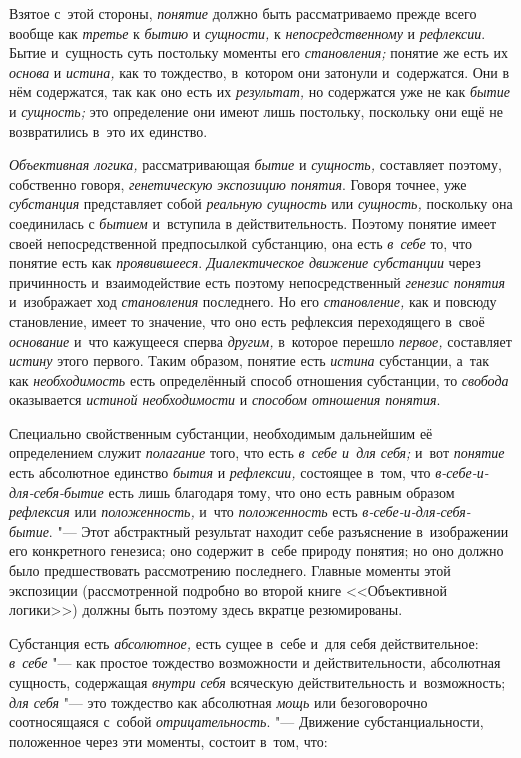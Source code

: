 Взятое с~этой стороны, {\em понятие} должно быть рассматриваемо прежде всего
вообще как {\em третье} к {\em бытию} и {\em сущности,} к
{\em непосредственному} и {\em рефлексии}. Бытие и~сущность суть постольку
моменты его {\em становления;} понятие же есть их {\em основа} и
{\em истина,} как то тождество, в~котором они затонули и~содержатся. Они в
нём содержатся, так как оно есть их {\em результат,} но содержатся уже не
как {\em бытие} и {\em сущность;} это определение они имеют лишь постольку,
поскольку они ещё не возвратились в~это их единство.

{\em Объективная логика,} рассматривающая {\em бытие} и {\em сущность,}
составляет поэтому, собственно говоря, {\em генетическую экспозицию понятия}.
Говоря точнее, уже {\em субстанция} представляет собой {\em реальную сущность}
или {\em сущность,} поскольку она соединилась с {\em бытием} и~вступила в
действительность. Поэтому понятие имеет своей непосредственной предпосылкой
субстанцию, она есть {\em в~себе} то, что понятие есть как {\em проявившееся}.
{\em Диалектическое движение субстанции} через причинность и~взаимодействие
есть поэтому непосредственный {\em генезис понятия} и~изображает ход
{\em становления} последнего. Но его {\em становление,} как и
повсюду становление, имеет то значение, что оно есть рефлексия переходящего
в~своё {\em основание} и~что кажущееся сперва {\em другим,} в~которое перешло
{\em первое,} составляет {\em истину} этого первого. Таким образом, понятие есть
{\em истина} субстанции, а~так как {\em необходимость} есть определённый
способ отношения субстанции, то {\em свобода} оказывается {\em истиной
необходимости} и {\em способом отношения понятия}.

Специально свойственным субстанции, необходимым дальнейшим её определением
служит {\em полагание} того, что есть {\em в~себе и~для себя;} и~вот
{\em понятие} есть абсолютное единство {\em бытия} и {\em рефлексии,}
состоящее в~том, что {\em в-себе-и-для-себя-бытие} есть лишь благодаря тому,
что оно есть равным образом {\em рефлексия} или {\em положенность,} и~что
{\em положенность} есть {\em в-себе-и-для-себя-бытие}. "--- Этот абстрактный
результат находит себе разъяснение в~изображении его конкретного генезиса;
оно содержит в~себе природу понятия; но оно должно было предшествовать
рассмотрению последнего. Главные моменты этой экспозиции (рассмотренной
подробно во второй книге <<Объективной логики>>) должны быть поэтому здесь
вкратце резюмированы.

Субстанция есть {\em абсолютное,} есть сущее в~себе и~для себя
действительное: {\em в~себе} "--- как простое тождество возможности и
действительности, абсолютная сущность, содержащая {\em внутри себя}
всяческую действительность и~возможность; {\em для себя} "--- это
тождество как абсолютная {\em мощь} или безоговорочно соотносящаяся с~собой
{\em отрицательность}. "--- Движение субстанциальности, положенное через эти
моменты, состоит в~том, что:

